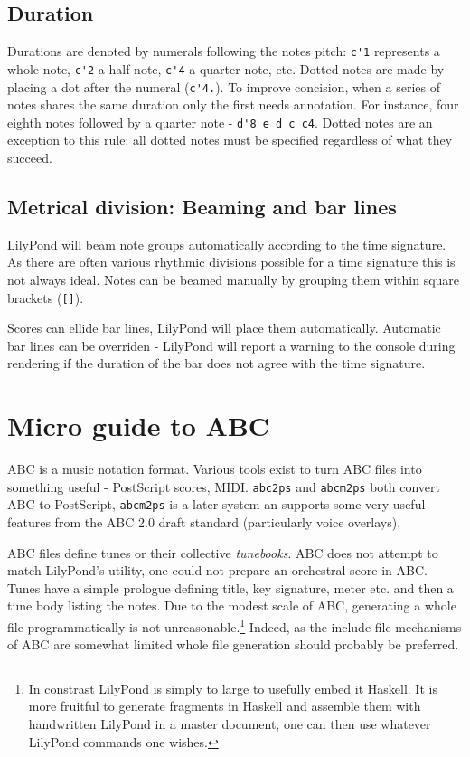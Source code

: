\documentclass{article}
\begin{document}
\subsection{Duration}
Durations are denoted by numerals following the notes pitch:
\verb+c'1+ represents a whole note, \verb+c'2+ a half note, 
\verb+c'4+ a quarter note, etc. Dotted notes are made by placing 
a dot after the numeral (\verb+c'4.+). To improve concision, 
when a series of notes shares the same duration only the first 
needs annotation. For instance, four eighth notes followed by a 
quarter note - \verb+d'8 e d c c4+. Dotted notes are an exception 
to this rule: all dotted notes must be specified regardless of
what they succeed.

\subsection{Metrical division: Beaming and bar lines}
LilyPond will beam note groups automatically according to the 
time signature. As there are often various rhythmic divisions 
possible for a time signature this is not always ideal. Notes 
can be beamed manually by grouping them within square brackets 
(\verb+[]+).

Scores can ellide bar lines, LilyPond will place them 
automatically. Automatic bar lines can be overriden - LilyPond 
will report a warning to the console during rendering if the 
duration of the bar does not agree with the time signature.


\section{Micro guide to ABC}
ABC is a music notation format. Various tools exist to turn ABC 
files into something useful - PostScript scores, MIDI. 
\verb+abc2ps+ and \verb+abcm2ps+ both convert ABC to PostScript, 
\verb+abcm2ps+ is a later system an supports some very useful 
features from the ABC 2.0 draft standard (particularly voice 
overlays). 

ABC files define tunes or their collective \emph{tunebooks}. ABC 
does not attempt to match LilyPond's utility, one could not 
prepare an orchestral score in ABC. Tunes have a simple prologue
defining title, key signature, meter etc. and then a tune body
listing the notes. Due to the modest scale of ABC, generating a
whole file programmatically is not unreasonable.\footnote{In 
constrast LilyPond is simply to large to usefully embed it 
Haskell. It is more fruitful to generate fragments in Haskell 
and assemble them with handwritten LilyPond in a master document, 
one can then use whatever LilyPond commands one wishes.} Indeed, 
as the include file mechanisms of ABC are somewhat limited whole 
file generation should probably be preferred.
\end{document}

